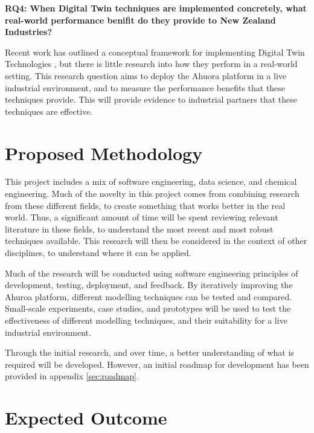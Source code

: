 \documentclass[12pt]{article}
\begin{document}
\textbf{RQ4: When Digital Twin techniques are implemented concretely, what real-world performance benifit do they provide to New Zealand Industries?}

Recent work has outlined a conceptual framework for implementing Digital Twin Technologies \cite{ors2020conceptual}, but there is little research into how they perform in a real-world setting. This research question aims to deploy the Ahuora platform in a live industrial environment, and to measure the performance benefits that these techniques provide. This will provide evidence to industrial partners that these techniques are effective. 


\section{Proposed Methodology}

% 

This project includes a mix of software engineering, data science, and chemical engineering. Much of the novelty in this project comes from combining research from these different fields, to create something that works better in the real world. Thus, a significant amount of time will be spent reviewing relevant literature in these fields, to understand the most recent and most robust techniques available. This research will then be considered in the context of other disciplines, to understand where it can be applied.

Much of the research will be conducted using software engineering principles of development, testing, deployment, and feedback. By iteratively improving the Ahuroa platform, different modelling techniques can be tested and compared. Small-scale experiments, case studies, and prototypes will be used to test the effectiveness of different modelling techniques, and their suitability for a live industrial environment.

Through the initial research, and over time, a better understanding of what is required will be developed. However, an initial roadmap for development has been provided in appendix \ref{sec:roadmap}.

\section{Expected Outcome}
\end{document}

